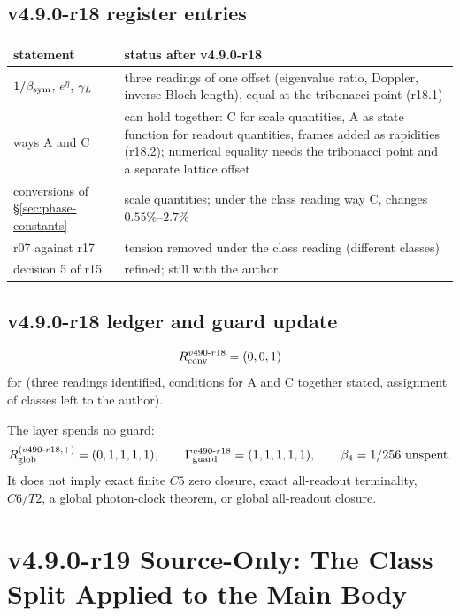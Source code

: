\subsection*{v4.9.0-r18 register entries}
\label{subsec:v490-r18-register}

\begin{center}
\small
\begin{tabular}{@{}>{\raggedright\arraybackslash}p{}>{\raggedright\arraybackslash}p{}@{}}
\toprule
statement & status after v4.9.0-r18\\
\midrule
\(1/\beta_{\mathrm{sym}}\), \(e^\eta\), \(\gamma_L\) & three readings of one offset (eigenvalue ratio, Doppler, inverse Bloch length), equal at the tribonacci point (r18.1)\\
ways A and C & can hold together: C for scale quantities, A as state function for readout quantities, frames added as rapidities (r18.2); numerical equality needs the tribonacci point and a separate lattice offset\\
conversions of \S\ref{sec:phase-constants} & scale quantities; under the class reading way C, changes \(0.55\%\)--\(2.7\%\)\\
r07 against r17 & tension removed under the class reading (different classes)\\
decision 5 of r15 & refined; still with the author\\
\bottomrule
\end{tabular}
\end{center}

\subsection*{v4.9.0-r18 ledger and guard update}
\label{subsec:v490-r18-ledger-guard}

\[
R_{\rm conv}^{v490\text{-}r18}=(0,0,1)
\]
for (three readings identified, conditions for A and C together stated, assignment of classes left to the author).

The layer spends no guard:
\[
R_{\rm glob}^{(v490\text{-}r18,+)}=(0,1,1,1,1),
\qquad
\Gamma_{\rm guard}^{v490\text{-}r18}=(1,1,1,1,1),
\qquad
\beta_4=1/256\ \text{unspent}.
\]
It does not imply exact finite \(C5\) zero closure, exact all-readout terminality,
\(C6/T2\), a global photon-clock theorem, or global all-readout closure.

\clearpage
\section*{v4.9.0-r19 Source-Only: The Class Split Applied to the Main Body}
\label{sec:v490-r19-class-split-applied}

